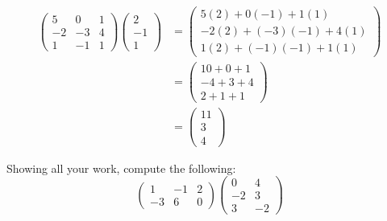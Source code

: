 \documentclass[11pt,letterpaper]{article}
\begin{document}
\sol 
	\[
	\begin{aligned}
	\begin{pmatrix}
	5 & 0 & 1 \\
	-2 & -3 & 4 \\
	1 & -1 & 1
	\end{pmatrix}
	\begin{pmatrix}
	2 \\
	-1 \\
	1
	\end{pmatrix}&=
	\begin{pmatrix}
	5(2) + 0(-1) + 1(1) \\
	-2(2) + (-3)(-1) + 4(1) \\
	1(2) + (-1)(-1) + 1(1) 
	\end{pmatrix} \\[0.3cm]
	&= 
	\begin{pmatrix}
	10 + 0 + 1 \\
	-4 + 3 + 4 \\
	2 + 1 + 1 
	\end{pmatrix} \\[0.3cm]
	&=
	\begin{pmatrix}
	11 \\
	3 \\
	4
	\end{pmatrix}
	\end{aligned}
	\]





\newpage





 Showing all your work, compute the following:
	\[
	\begin{pmatrix}
	1 & -1 & 2 \\
	-3 & 6 & 0
	\end{pmatrix}
	\begin{pmatrix}
	0 & 4 \\
	-2 & 3 \\
	3 & -2
	\end{pmatrix}
	\] \pspace
\end{document}
